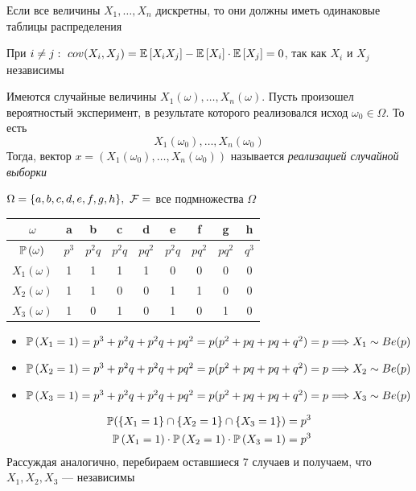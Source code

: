 \documentclass[a4paper, 10pt]{article}
\begin{document}
\comment Если все величины $X_1,\ldots,X_n$ дискретны, то они должны иметь одинаковые таблицы распределения

\comment При $i\ne j:\ cov(X_i,X_j)=\matwait{X_iX_j}-\matwait{X_i}\cdot\matwait{X_j}=0$, так как $X_i$ и $X_j$ независимы

Имеются случайные величины $X_1(\omega),\ldots,X_n(\omega)$. Пусть произошел вероятностый эксперимент, в результате которого реализовался исход $\omega_0\in\Omega$. То есть 
\begin{equation*}
    X_1(\omega_0),\ldots,X_n(\omega_0)
\end{equation*}
Тогда, вектор $x=(X_1(\omega_0),\ldots,X_n(\omega_0))$ называется \textit{реализацией случайной выборки}

\ex $\Omega=\{a,b,c,d,e,f,g,h\},\ \mathcal{F} =$ все подмножества $\Omega$

    \begin{tabular}{c|c|c|c|c|c|c|c|c}
        $\omega$ & a & b& c &d &e &f &g &h\\
        \hline
        $\mathbb{P}\left(\omega\right)$ & $p^3$ & $p^2q$ & $p^2q$ & $pq^2$ & $p^2q$ & $pq^2$ & $pq^2$ & $q^3$\\
        \hline 
        $X_1(\omega)$ & 1 &1& 1& 1& 0& 0& 0& 0\\
        \hline
        $X_2(\omega) $& 1 &1& 0& 0& 1& 1& 0& 0\\
        \hline
        $X_3(\omega)$ &1& 0& 1& 0& 1 &0 &1 &0
    \end{tabular}
\begin{itemize}
    \item $\mathbb{P}\left(X_1=1\right)=p^3+p^2q+p^2q+pq^2=p(p^2+pq+pq+q^2)=p\Longrightarrow X_1\sim Be(p)$

    \item $\mathbb{P}\left(X_2=1\right)=p^3+p^2q+p^2q+pq^2=p(p^2+pq+pq+q^2)=p\Longrightarrow X_2\sim Be(p)$
    
    \item $\mathbb{P}\left(X_3=1\right)=p^3+p^2q+p^2q+pq^2=p(p^2+pq+pq+q^2)=p\Longrightarrow X_3\sim Be(p)$
\end{itemize}

\begin{equation*}
    \begin{aligned}
        \mathbb{P}(\{X_1=1\}\cap\{X_2=1\}\cap\{X_3=1\})&=p^3\\
        \mathbb{P}\left(X_1=1\right)\cdot\mathbb{P}\left(X_2=1\right)\cdot\mathbb{P}\left(X_3=1\right)&=p^3
    \end{aligned}
\end{equation*}
Рассуждая аналогично, перебираем оставшиеся 7 случаев и получаем, что $X_1,X_2,X_3$ — независимы
\end{document}
